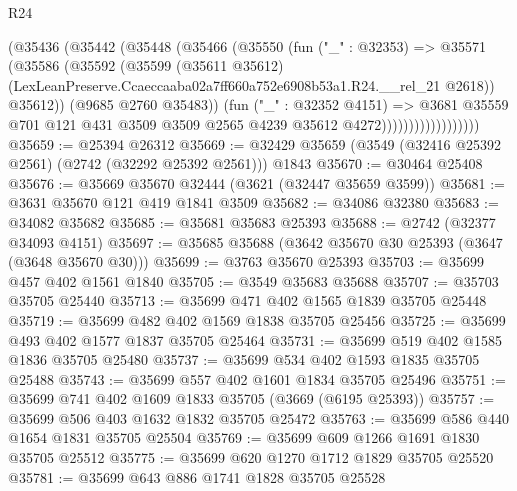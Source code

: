 \begin{lexlean}{R24}
\begin{coremodule}
                            (@35436
                              (@35442
                                (@35448
                                  (@35466
                                    (@35550
                                      (fun ("_" : @32353) =>
                                      @35571
                                        (@35586
                                          (@35592
                                            (@35599
                                              (@35611 @35612)
                                              (LexLeanPreserve.Ccaeccaaba02a7ff660a752e6908b53a1.R24.__rel_21
                                                @2618))
                                            @35612))
                                        (@9685 @2760 @35483))
                                      (fun ("_" : @32352 @4151) =>
                                      @3681
                                        @35559
                                        @701
                                        @121
                                        @431
                                        @3509
                                        @3509
                                        @2565
                                        @4239
                                        @35612
                                        @4272))))))))))))))))))
@35659 := @25394 @26312
@35669 := @32429 @35659 (@3549 (@32416 @25392 @2561) (@2742 (@32292 @25392 @2561))) @1843
@35670 := @30464 @25408
@35676 := @35669 @35670 @32444 (@3621 (@32447 @35659 @3599))
@35681 := @3631 @35670 @121 @419 @1841 @3509
@35682 := @34086 @32380
@35683 := @34082 @35682
@35685 := @35681 @35683 @25393
@35688 := @2742 (@32377 @34093 @4151)
@35697 := @35685 @35688 (@3642 @35670 @30 @25393 (@3647 (@3648 @35670 @30)))
@35699 := @3763 @35670 @25393
@35703 := @35699 @457 @402 @1561 @1840
@35705 := @3549 @35683 @35688
@35707 := @35703 @35705 @25440
@35713 := @35699 @471 @402 @1565 @1839 @35705 @25448
@35719 := @35699 @482 @402 @1569 @1838 @35705 @25456
@35725 := @35699 @493 @402 @1577 @1837 @35705 @25464
@35731 := @35699 @519 @402 @1585 @1836 @35705 @25480
@35737 := @35699 @534 @402 @1593 @1835 @35705 @25488
@35743 := @35699 @557 @402 @1601 @1834 @35705 @25496
@35751 := @35699 @741 @402 @1609 @1833 @35705 (@3669 (@6195 @25393))
@35757 := @35699 @506 @403 @1632 @1832 @35705 @25472
@35763 := @35699 @586 @440 @1654 @1831 @35705 @25504
@35769 := @35699 @609 @1266 @1691 @1830 @35705 @25512
@35775 := @35699 @620 @1270 @1712 @1829 @35705 @25520
@35781 := @35699 @643 @886 @1741 @1828 @35705 @25528

\end{coremodule}
\end{lexlean}
